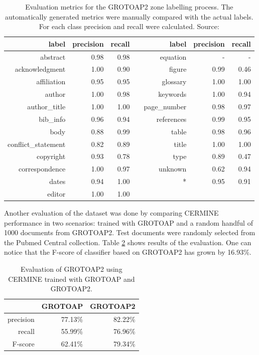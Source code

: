 \begin{table}
\centering
\begin{tabular}{@{}rrrcrrr@{}}
 \toprule
label & precision & recall & \phantom{abc} & label & precision & recall\\ \midrule
abstract & 0.98 & 0.98 && equation & - & - \\ 
acknowledgment & 1.00 & 0.90 && figure & 0.99 & 0.46 \\ 
affiliation & 0.95 & 0.95 && glossary & 1.00 & 1.00 \\ 
author & 1.00 & 0.98 && keywords & 1.00 & 0.94 \\ 
author\_title & 1.00 & 1.00 && page\_number & 0.98 & 0.97 \\ 
bib\_info & 0.96 & 0.94 && references & 0.99 & 0.95 \\ 
body & 0.88 & 0.99 && table & 0.98 & 0.96 \\ 
conflict\_statement & 0.82 & 0.89 && title & 1.00 & 1.00 \\ 
copyright & 0.93 & 0.78 && type & 0.89 & 0.47 \\ 
correspondence & 1.00 & 0.97 && unknown & 0.62 & 0.94 \\ 
dates & 0.94 & 1.00 && * & 0.95 & 0.91 \\ 
editor & 1.00 & 1.00 &&   &      &       \\
\bottomrule
\end{tabular}
\caption{Evaluation metrics for the GROTOAP2 zone labelling process. The automatically generated metrics were manually compared with the actual labels. For each class precision and recall were calculated. Source: \cite{DominikaTkaczykPaweSzostek2014}}
\label{tab:grotoap2_evaluation}
\end{table}

Another evaluation of the dataset was done by comparing CERMINE performance in two scenarios: trained with GROTOAP and a random handful of 1000 documents from GROTOAP2. Test documents were randomly selected from the Pubmed Central collection. Table \ref{tab:grotoap2_cermine_evaluation} shows results of the evaluation. One can notice that the F-score of classifier based on GROTOAP2 has grown by 16.93\%.

\begin{table}[]
\centering
\begin{tabular}{@{}rrr@{}}
\toprule
& GROTOAP & GROTOAP2 \\
\midrule
precision & 77.13\% & 82.22\% \\
recall & 55.99\% & 76.96\% \\
F-score & 62.41\% & 79.34\% \\
\bottomrule
\end{tabular}
\caption{Evaluation of GROTOAP2 using CERMINE trained with GROTOAP and GROTOAP2.}
\label{tab:grotoap2_cermine_evaluation}
\end{table}

